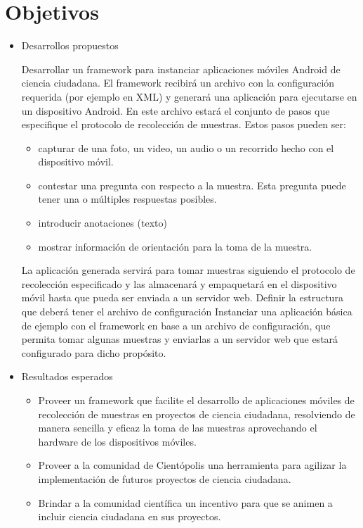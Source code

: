 \section{ Objetivos }

	\begin{itemize} 
		\item Desarrollos propuestos
		\begin{description}
			Desarrollar un framework para instanciar aplicaciones móviles Android de ciencia ciudadana. El framework recibirá un archivo con la configuración requerida (por ejemplo en XML) y generará una aplicación para ejecutarse en un dispositivo Android. En este archivo estará el conjunto de pasos que especifique el protocolo de recolección de muestras. Estos pasos pueden ser:
			\begin{itemize}
				\item capturar de una foto, un video, un audio o un recorrido hecho con el dispositivo móvil.
				\item contestar una pregunta con respecto a la muestra. Esta pregunta puede tener una o múltiples respuestas posibles.
				\item introducir anotaciones (texto)
				\item mostrar información de orientación para la toma de la muestra.
			\end{itemize}
		La aplicación generada servirá para tomar muestras siguiendo el protocolo de recolección especificado y las almacenará y empaquetará en el dispositivo móvil hasta que pueda ser enviada a un servidor web.
		Definir la estructura que deberá tener el archivo de configuración
		Instanciar una aplicación básica de ejemplo con el framework en base a un archivo de configuración, que permita tomar algunas muestras y enviarlas a un servidor web que estará configurado para dicho propósito.
		\end{description}
	
		\item Resultados esperados
		\begin{itemize}
			\item Proveer un framework que facilite el desarrollo de aplicaciones móviles de recolección de muestras en proyectos de ciencia ciudadana, resolviendo de manera sencilla y eficaz la toma de las muestras  aprovechando el hardware de los dispositivos móviles.
			\item Proveer a la comunidad de Cientópolis una herramienta para agilizar la implementación de futuros proyectos de ciencia ciudadana. 
			\item Brindar a la comunidad científica un incentivo para que se animen a incluir ciencia ciudadana en sus proyectos.
		\end{itemize}	
	\end{itemize}


